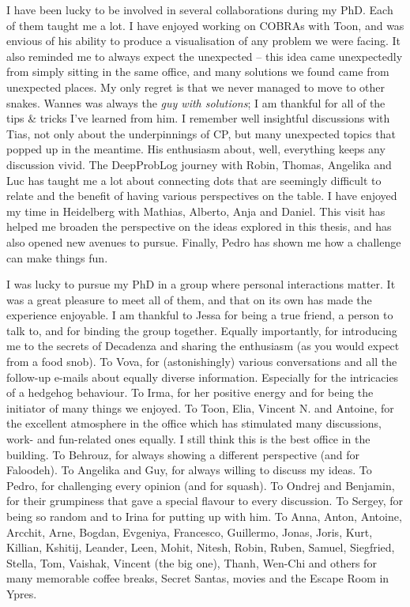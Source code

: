 I have been lucky to be involved in several collaborations during my PhD.
Each of them taught me a lot.
I have enjoyed working on COBRAs with Toon, and was envious of his ability to produce a visualisation of any problem we were facing.
It also reminded me to always expect the unexpected -- this idea came unexpectedly from simply sitting in the same office, and many solutions we found came from unexpected places.
My only regret is that we never managed to move to other snakes.
Wannes was always the \textit{guy with solutions}; I am thankful for all of the tips \& tricks I've learned from him.
I remember well insightful discussions with Tias, not only about the underpinnings of CP, but many unexpected topics that popped up in the meantime.
His enthusiasm about, well, everything keeps any discussion vivid.
The DeepProbLog journey with Robin, Thomas, Angelika and Luc has taught me a lot about connecting dots that are seemingly difficult to relate and the benefit of having various perspectives on the table.
I have enjoyed my time in Heidelberg with Mathias, Alberto, Anja and Daniel.
This visit has helped me broaden the perspective on the ideas explored in this thesis, and has also opened new avenues to pursue.
Finally, Pedro has shown me how a challenge can make things fun.






I was lucky to pursue my PhD in a group where personal interactions matter.
It was a great pleasure to meet all of them, and that on its own has made the experience enjoyable.
I am thankful to Jessa for being a true friend, a person to talk to, and for binding the group together.
Equally importantly, for introducing me to the secrets of Decadenza and sharing the enthusiasm (as you would expect from a food snob).
To Vova, for (astonishingly) various conversations and all the follow-up e-mails about equally diverse information.
Especially for the intricacies of a hedgehog behaviour.
To Irma, for her positive energy and for being the initiator of many things we enjoyed.
To Toon, Elia, Vincent N. and Antoine, for the excellent atmosphere in the office which has stimulated many discussions, work- and fun-related ones equally.
I still think this is the best office in the building.
To Behrouz, for always showing a different perspective (and for Faloodeh).
To Angelika and Guy, for always willing to discuss my ideas.
To Pedro, for challenging every opinion (and for squash).
To Ondrej and Benjamin, for their grumpiness that gave a special flavour to every discussion.
To Sergey, for being so random and to Irina for putting up with him.
To Anna, Anton, Antoine, Arcchit, Arne, Bogdan, Evgeniya, Francesco, Guillermo, Jonas, Joris, Kurt, Killian, Kshitij, Leander, Leen, Mohit, Nitesh, Robin, Ruben, Samuel, Siegfried, Stella, Tom, Vaishak, Vincent (the big one), Thanh, Wen-Chi and others for many memorable coffee breaks, Secret Santas, movies and the Escape Room in Ypres.




